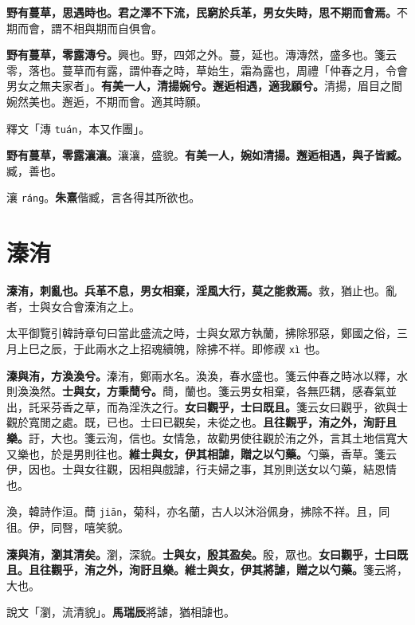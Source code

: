 
\textbf{野有蔓草，思遇時也。君之澤不下流，民窮於兵革，男女失時，思不期而會焉。}{\footnotesize 不期而會，謂不相與期而自俱會。}

\textbf{野有蔓草，零露漙兮。}{\footnotesize 興也。野，四郊之外。蔓，延也。漙漙然，盛多也。箋云零，落也。蔓草而有露，謂仲春之時，草始生，霜為露也，周禮「仲春之月，令會男女之無夫家者」。}\textbf{有美一人，清揚婉兮。邂逅相遇，適我願兮。}{\footnotesize 清揚，眉目之間婉然美也。邂逅，不期而會。適其時願。}

\begin{quoting}釋文「漙 \texttt{tuán}，本又作團」。\end{quoting}

\textbf{野有蔓草，零露瀼瀼。}{\footnotesize 瀼瀼，盛貌。}\textbf{有美一人，婉如清揚。邂逅相遇，與子皆臧。}{\footnotesize 臧，善也。}

\begin{quoting}瀼 \texttt{ráng}。\textbf{朱熹}偕臧，言各得其所欲也。\end{quoting}

\section{溱洧}


\textbf{溱洧，刺亂也。兵革不息，男女相棄，淫風大行，莫之能救焉。}{\footnotesize 救，猶止也。亂者，士與女合會溱洧之上。}

\begin{quoting}太平御覽引韓詩章句曰當此盛流之時，士與女眾方執蘭，拂除邪惡，鄭國之俗，三月上巳之辰，于此兩水之上招魂續魄，除拂不祥。即修禊 \texttt{xì} 也。\end{quoting}

\textbf{溱與洧，方渙渙兮。}{\footnotesize 溱洧，鄭兩水名。渙渙，春水盛也。箋云仲春之時冰以釋，水則渙渙然。}\textbf{士與女，方秉蕳兮。}{\footnotesize 蕳，蘭也。箋云男女相棄，各無匹耦，感春氣並出，託采芬香之草，而為淫泆之行。}\textbf{女曰觀乎，士曰既且。}{\footnotesize 箋云女曰觀乎，欲與士觀於寬閒之處。既，已也。士曰已觀矣，未從之也。}\textbf{且往觀乎，洧之外，洵訏且樂。}{\footnotesize 訏，大也。箋云洵，信也。女情急，故勸男使往觀於洧之外，言其土地信寬大又樂也，於是男則往也。}\textbf{維士與女，伊其相謔，贈之以勺藥。}{\footnotesize 勺藥，香草。箋云伊，因也。士與女往觀，因相與戲謔，行夫婦之事，其別則送女以勺藥，結恩情也。}

\begin{quoting}渙，韓詩作洹。蕳 \texttt{jiān}，菊科，亦名蘭，古人以沐浴佩身，拂除不祥。且，同徂。伊，同㗨，嘻笑貌。\end{quoting}

\textbf{溱與洧，瀏其清矣。}{\footnotesize 瀏，深貌。}\textbf{士與女，殷其盈矣。}{\footnotesize 殷，眾也。}\textbf{女曰觀乎，士曰既且。且往觀乎，洧之外，洵訏且樂。維士與女，伊其將謔，贈之以勺藥。}{\footnotesize 箋云將，大也。}

\begin{quoting}說文「瀏，流清貌」。\textbf{馬瑞辰}將謔，猶相謔也。\end{quoting}

